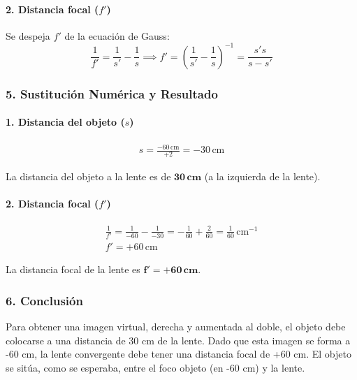 \paragraph{2. Distancia focal ($f'$)}
Se despeja $f'$ de la ecuación de Gauss:
$$ \frac{1}{f'} = \frac{1}{s'} - \frac{1}{s} \implies f' = \left(\frac{1}{s'} - \frac{1}{s}\right)^{-1} = \frac{s's}{s-s'} $$

\subsubsection*{5. Sustitución Numérica y Resultado}
\paragraph{1. Distancia del objeto ($s$)}
\begin{gather}
    s = \frac{-60\,\text{cm}}{+2} = -30\,\text{cm}
\end{gather}
\begin{cajaresultado}
La distancia del objeto a la lente es de $\boldsymbol{30\,\textbf{cm}}$ (a la izquierda de la lente).
\end{cajaresultado}

\paragraph{2. Distancia focal ($f'$)}
\begin{gather}
    \frac{1}{f'} = \frac{1}{-60} - \frac{1}{-30} = -\frac{1}{60} + \frac{2}{60} = \frac{1}{60}\,\text{cm}^{-1} \\
    f' = +60\,\text{cm}
\end{gather}
\begin{cajaresultado}
La distancia focal de la lente es $\boldsymbol{f' = +60\,\textbf{cm}}$.
\end{cajaresultado}

\subsubsection*{6. Conclusión}
\begin{cajaconclusion}
Para obtener una imagen virtual, derecha y aumentada al doble, el objeto debe colocarse a una distancia de 30 cm de la lente. Dado que esta imagen se forma a -60 cm, la lente convergente debe tener una distancia focal de +60 cm. El objeto se sitúa, como se esperaba, entre el foco objeto (en -60 cm) y la lente.
\end{cajaconclusion}

